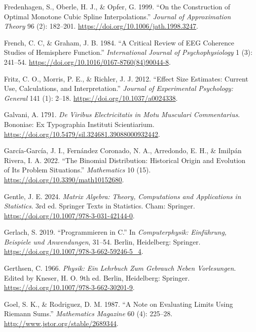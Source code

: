 \documentclass[
]{article}
\newlength{\cslhangindent}
\newlength{\cslentryspacingunit} %
\newenvironment{CSLReferences}[2] %
 {%
  \setlength{\parindent}{0pt}
  \ifodd #1
  \let\oldpar\par
  \def\par{\hangindent=\cslhangindent\oldpar}
  \fi
  \setlength{\parskip}{#2\cslentryspacingunit}
 }%
 {}
\begin{document}
\begin{CSLReferences}{1}{0}
\leavevmode{}%
Fredenhagen, S., Oberle, H. J., \& Opfer, G. 1999. {``On the
Construction of Optimal Monotone Cubic Spline Interpolations.''}
\emph{Journal of Approximation Theory} 96 (2): 182--201.
\url{https://doi.org/10.1006/jath.1998.3247}.

\leavevmode{}%
French, C. C, \& Graham, J. B. 1984. {``A Critical Review of EEG
Coherence Studies of Hemisphere Function.''} \emph{International Journal
of Psychophysiology} 1 (3): 241--54.
\url{https://doi.org/10.1016/0167-8760(84)90044-8}.

\leavevmode{}%
Fritz, C. O., Morris, P. E., \& Richler, J. J. 2012. {``Effect Size
Estimates: Current Use, Calculations, and Interpretation.''}
\emph{Journal of Experimental Psychology: General} 141 (1): 2--18.
\url{https://doi.org/10.1037/a0024338}.

\leavevmode{}%
Galvani, A. 1791. \emph{De Viribus Electricitatis in Motu Musculari
Commentarius}. Bononiae: Ex Typographia Instituti Scientiarium.
\url{https://doi.org/10.5479/sil.324681.39088000932442}.

\leavevmode{}%
García-García, J. I., Fernández Coronado, N. A., Arredondo, E. H., \&
Imilpán Rivera, I. A. 2022. {``The Binomial Distribution: Historical
Origin and Evolution of Its Problem Situations.''} \emph{Mathematics} 10
(15). \url{https://doi.org/10.3390/math10152680}.

\leavevmode{}%
Gentle, J. E. 2024. \emph{Matrix Algebra: Theory, Computations and
Applications in Statistics}. 3rd ed. Springer Texts in Statistics. Cham:
Springer. \url{https://doi.org/10.1007/978-3-031-42144-0}.

\leavevmode{}%
Gerlach, S. 2019. {``{Programmieren in C}.''} In \emph{{Computerphysik:
Einführung, Beispiele und Anwendungen}}, 31--54. Berlin, Heidelberg:
Springer. \url{https://doi.org/10.1007/978-3-662-59246-5_4}.

\leavevmode{}%
Gerthsen, C. 1966. \emph{Physik: Ein Lehrbuch Zum Gebrauch Neben
Vorlesungen}. Edited by Kneser, H. O. 9th ed. Berlin, Heidelberg:
Springer. \url{https://doi.org/10.1007/978-3-662-30201-9}.

\leavevmode{}%
Goel, S. K., \& Rodriguez, D. M. 1987. {``A Note on Evaluating Limits
Using Riemann Sums.''} \emph{Mathematics Magazine} 60 (4): 225--28.
\url{http://www.jstor.org/stable/2689344}.


\end{CSLReferences}
\end{document}
